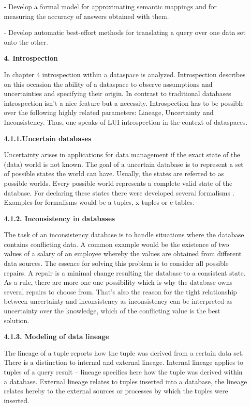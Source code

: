 - Develop a formal model  for approximating semantic mappings and for measuring the accuracy of answers obtained with them.

- Develop automatic best-effort methods for translating a query over one data set onto the other.

\textbf{{\large 4. Introspection}}

In chapter 4 introspection within a dataspace is analyzed. Introspection describes on this occasion the ability of a dataspace to observe assumptions and uncertainties and specifying their origin. In contrast to traditional databases introspection isn't a nice feature but a necessity. Introspection has to be possible over the following highly related parameters: Lineage, Uncertainty and Inconsistency. Thus, one speaks of LUI introspection in the context of dataspaces.

\textbf{4.1.1.Uncertain databases }

Uncertainty arises in applications for data management if the exact state of the (data) world is not known. The goal of a uncertain database is to represent a set of possible states the world can have. Usually, the states are referred to as possible worlds. Every possible world represents a complete valid state of the database. For declaring these states there were developed several formalisms \cite{FoundationOfDatabases1995, Barbara:1992:MPD:627288.627535, WorkingModelsForUncertainData, Grahne:1984:DSD:645912.671297, Lakshmanan:1997:PFP:261124.261131}. Examples for formalisms would be a-tuples, x-tuples or c-tables\cite{DBLP:reference/db/Grahne09a}.


\textbf{4.1.2. Inconsistency in databases}

The task of an inconsistency database is to handle situations where the database contains conflicting data. A common example would be the existence of two values of a salary of an employee whereby the values are obtained from different data sources. The essence for solving this problem is to consider all possible repairs. A repair is a minimal change resulting the database to a consistent state. As a rule, there are more one one possibility which is why the database owns several repairs to choose from. That's also the reason for the tight relationship between uncertainty and inconsistency as inconsistency can be interpreted as uncertainty over the knowledge, which of the conflicting value is the best solution.

\textbf{4.1.3. Modeling of data lineage}

The lineage of a tuple reports how the tuple was derived from a certain data set. There is a distinction to internal and external lineage. Internal lineage applies to tuples of a query result -- lineage specifies here how the tuple was derived within a database. External lineage relates to tuples inserted into a database, the lineage relates hereby to the external sources or processes by which the tuples were inserted. 


